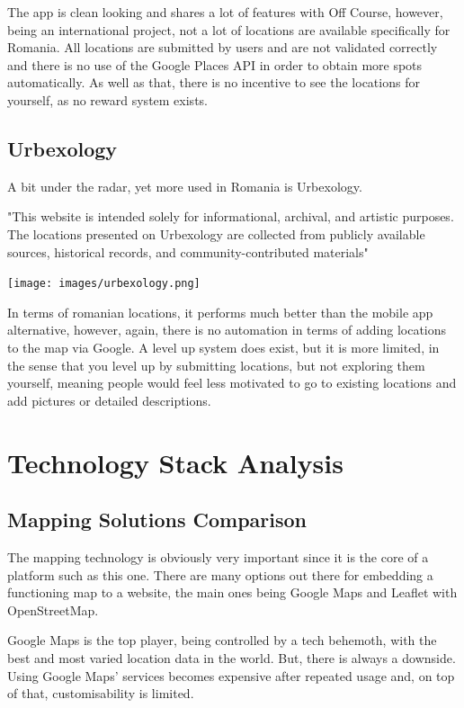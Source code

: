 \documentclass[12pt,a4paper]{report}
\begin{document}
The app is clean looking and shares a lot of features with Off Course, however, being an international project, not a lot of locations are available specifically for Romania. All locations are submitted by users and are not validated correctly and there is no use of the Google Places API in order to obtain more spots automatically.
As well as that, there is no incentive to see the locations for yourself, as no reward system exists. 

\subsection{Urbexology}
A bit under the radar, yet more used in Romania is Urbexology.

"This website is intended solely for informational, archival, and artistic purposes. The locations presented on Urbexology are collected from publicly available sources, historical records, and community-contributed materials"~\cite{appUrbexology}

\begin{center}
\texttt{[image: images/urbexology.png]}
\end{center}

In terms of romanian locations, it performs much better than the mobile app alternative, however, again, there is no automation in terms of adding locations to the map via Google. A level up system does exist, but it is more limited, in the sense that you level up by submitting locations, but not exploring them yourself, meaning people would feel less motivated to go to existing locations and add pictures or detailed descriptions.

\section{Technology Stack Analysis}
\subsection{Mapping Solutions Comparison}

The mapping technology is obviously very important since it is the core of a platform such as this one. There are many options out there for embedding a functioning map to a website, the main ones being Google Maps and Leaflet with OpenStreetMap.

Google Maps is the top player, being controlled by a tech behemoth, with the best and most varied location data in the world. But, there is always a downside. Using Google Maps' services becomes expensive after repeated usage and, on top of that, customisability is limited.
\end{document}
